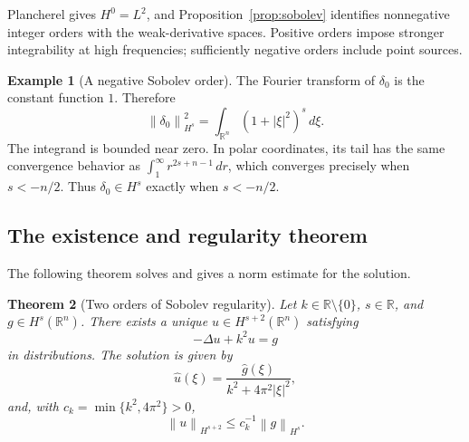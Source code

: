 \documentclass[11pt]{article}
\numberwithin{equation}{section}
\newtheorem{theorem}{Theorem}[section]
\theoremstyle{definition}
\newtheorem{example}[theorem]{Example}
\theoremstyle{remark}
\newcommand{\R}{\mathbb R}
\newcommand{\dd}{\,d}
\newcommand{\norm}[1]{\left\|#1\right\|}
\newcommand{\wh}[1]{\widehat{#1}}
\begin{document}
Plancherel gives \(H^0=L^2\), and Proposition~\ref{prop:sobolev} identifies nonnegative integer orders with the weak-derivative spaces. Positive orders impose stronger integrability at high frequencies; sufficiently negative orders include point sources.

\begin{example}[A negative Sobolev order]
The Fourier transform of \(\delta_0\) is the constant function \(1\). Therefore
\[
 \norm{\delta_0}_{H^s}^2=\int_{\R^n}(1+|\xi|^2)^s\dd\xi.
\]
The integrand is bounded near zero. In polar coordinates, its tail has the same convergence behavior as \(\int_1^\infty r^{2s+n-1}\dd r\), which converges precisely when \(s<-n/2\). Thus \(\delta_0\in H^s\) exactly when \(s<-n/2\).
\end{example}

\subsection{The existence and regularity theorem}
The following theorem solves \cite[Problem 4]{vese-pde} and gives a norm estimate for the solution.
\begin{theorem}[Two orders of Sobolev regularity]\label{thm:pde}
Let \(k\in\R\setminus\{0\}\), \(s\in\R\), and \(g\in H^s(\R^n)\). There exists a unique \(u\in H^{s+2}(\R^n)\) satisfying
\[
 -\Delta u+k^2u=g
\]
in distributions. The solution is given by
\begin{equation}\label{eq:pdesolution}
 \wh u(\xi)=\frac{\wh g(\xi)}{k^2+4\pi^2|\xi|^2},
\end{equation}
and, with \(c_k=\min\{k^2,4\pi^2\}>0\),
\begin{equation}\label{eq:pdeestimate}
 \norm u_{H^{s+2}}\le c_k^{-1}\norm g_{H^s}.
\end{equation}
\end{theorem}
\end{document}
